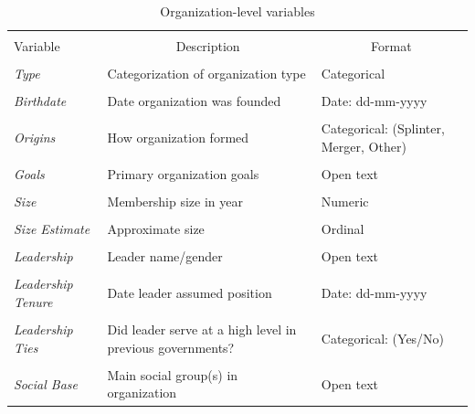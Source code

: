 \begin{table}[!htbp] \centering 
  \caption{Organization-level variables} 
  \label{Tab: Table 1} 
\begin{tabular}{p{3cm} p{7cm} p{6cm}} 
\\[-1.8ex]\hline 
\hline \\[-1.8ex] 
Variable & \multicolumn{1}{c}{Description} & \multicolumn{1}{c}{Format} \\
\hline \\[-1.8ex] 
\emph{Type}                     &     Categorization of organization type                                   & Categorical  \\ 
\hline \\[-1.8ex] 
\emph{Birthdate}               &     Date organization was founded                                     & Date: dd-mm-yyyy \\ 
\hline \\[-1.8ex] 
\emph{Origins}                  &     How organization formed                                         & Categorical: (Splinter, Merger, Other) \\ 
\hline \\[-1.8ex] 
\emph{Goals}                    &     Primary organization goals                                            & Open text \\ 
\hline \\[-1.8ex] 
\emph{Size}                     &     Membership size in year                                         & Numeric \\ 
\hline \\[-1.8ex] 
\emph{Size Estimate}            &     Approximate size                                                      & Ordinal \\ 
\hline \\[-1.8ex] 
\emph{Leadership}               &     Leader name/gender                                             & Open text \\ 
\hline \\[-1.8ex] 
\emph{Leadership Tenure}        &     Date leader assumed position                                     & Date: dd-mm-yyyy \\ 
\hline \\[-1.8ex] 
\emph{Leadership Ties}          &     Did leader serve at a high level in previous governments?         & Categorical: (Yes/No) \\ 
\hline \\[-1.8ex] 
\emph{Social Base}              &     Main social group(s) in organization                 & Open text \\ 

\end{tabular}
\end{table}
